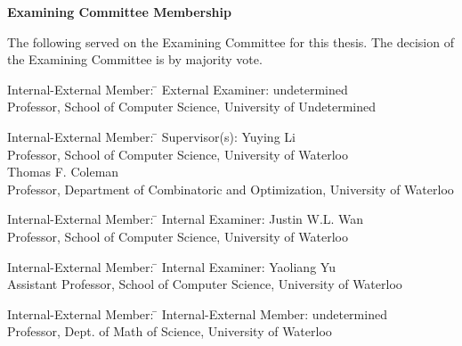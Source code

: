 \cleardoublepage %


\begin{center}\textbf{Examining Committee Membership}\end{center}
  \noindent
The following served on the Examining Committee for this thesis. The decision of the Examining Committee is by majority vote.
  \bigskip

  \noindent
\begin{tabbing}
Internal-External Member: \=  \kill %
External Examiner: \>  undetermined \\
\> Professor, School of Computer Science, University of Undetermined \\
\end{tabbing}
  \bigskip

  \noindent
\begin{tabbing}
Internal-External Member: \=  \kill %
Supervisor(s): \> Yuying Li \\
\> Professor, School of Computer Science, University of Waterloo \\
\> Thomas F. Coleman \\
\> Professor, Department of Combinatoric and Optimization, University of Waterloo \\
\end{tabbing}
  \bigskip

  \noindent
  \begin{tabbing}
Internal-External Member: \=  \kill %
Internal Examiner: \>  Justin W.L. Wan \\
\> Professor, School of Computer Science, University of Waterloo \\
\end{tabbing}
  \bigskip


  \begin{tabbing}
Internal-External Member: \=  \kill %
Internal Examiner: \>  Yaoliang Yu \\
\> Assistant Professor, School of Computer Science, University of Waterloo \\
\end{tabbing}
  \bigskip
  \noindent
\begin{tabbing}
Internal-External Member: \=  \kill %
Internal-External Member: \> undetermined \\
\> Professor, Dept. of Math of Science, University of Waterloo \\
\end{tabbing}
  \bigskip

